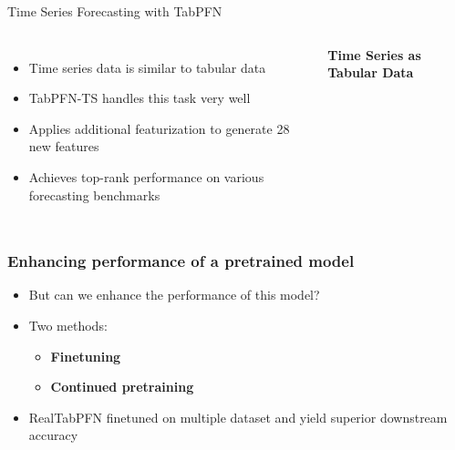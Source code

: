 \documentclass[t,aspectratio=169,svgnames]{beamer}
\begin{document}
\begin{frame}{Time Series Forecasting with TabPFN}

\begin{columns}[T]


\begin{itemize}
    \setlength{\itemsep}{10pt}

    \item<1-> Time series data is similar to tabular data

    \item<1-> TabPFN-TS \citep{hoo2025tables} handles this task very well

    \item<1-> Applies additional featurization to generate 28 new features

    \item<1-> Achieves top-rank performance on various forecasting benchmarks
\end{itemize}


\centering

\textbf<1->{Time Series as Tabular Data}

\vspace{0.4cm}


\end{columns}

\end{frame}
\begin{frame}
    \frametitle{Enhancing performance of a pretrained model}
    \begin{itemize}
        \setlength{\itemsep}{10pt}
    \item But can we enhance the performance of this model?

    \item<2-> Two methods:
    \begin{itemize}
        \setlength{\itemsep}{10pt}
        \item<3-> \textbf{Finetuning}
        \item<4-> \textbf{Continued pretraining}
    \end{itemize}
    \item<5-> RealTabPFN \citep{Hollmann_2025} finetuned on multiple dataset and yield superior downstream accuracy %
    \end{itemize}
\end{frame}
\end{document}
